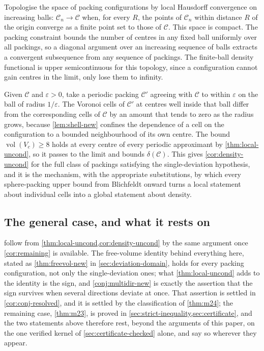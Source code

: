 \documentclass[11pt,reqno]{amsart}
\renewcommand{\_}{\origunderscore\allowbreak}
\numberwithin{equation}{section}
\theoremstyle{plain}
\theoremstyle{definition}
\theoremstyle{remark}
\DeclareMathOperator{\vol}{vol}
\begin{document}
Topologise the space of packing configurations by local Hausdorff
convergence on increasing balls: $\mathcal{C}_n\to\mathcal{C}$ when, for
every $R$, the points of $\mathcal{C}_n$ within distance $R$ of the
origin converge as a finite point set to those of $\mathcal{C}$. This
space is compact. The packing constraint bounds the number of centres in
any fixed ball uniformly over all packings, so a diagonal argument over
an increasing sequence of balls extracts a convergent subsequence from
any sequence of packings. The finite-ball density functional is upper
semicontinuous for this topology, since a configuration cannot gain
centres in the limit, only lose them to infinity.

Given $\mathcal{C}$ and $\varepsilon>0$, take a periodic packing
$\mathcal{C}'$ agreeing with $\mathcal{C}$ to within $\varepsilon$ on
the ball of radius $1/\varepsilon$. The Voronoi cells of $\mathcal{C}'$
at centres well inside that ball differ from the corresponding cells of
$\mathcal{C}$ by an amount that tends to zero as the radius grows,
because \cref{lem:shell-new} confines the dependence of a cell on the
configuration to a bounded neighbourhood of its own centre. The bound
$\vol(V_c)\ge8$ holds at every centre of every periodic approximant by
\cref{thm:local-uncond}, so it passes to the limit and bounds
$\delta(\mathcal{C})$. This gives \cref{cor:density-uncond} for the full
class of packings satisfying the single-deviation hypothesis, and it is
the mechanism, with the appropriate substitutions, by which every
sphere-packing upper bound from Blichfeldt \cite{Bli29} onward turns a
local statement about individual cells into a global statement about
density.

\subsection{The general case, and what it rests on}

 follow from
\cref{thm:local-uncond,cor:density-uncond} by the same argument once
\cref{cor:remaining} is available. The free-volume identity behind
everything here, stated as \cref{thm:freevol-new} in
\cref{sec:deviation-domain}, holds for every packing configuration, not
only the single-deviation ones; what \cref{thm:local-uncond} adds to the
identity is the sign, and \cref{conj:multidir-new} is exactly the
assertion that the sign survives when several directions deviate at
once. That assertion is settled in \cref{cor:conj-resolved}, and it is
settled by the classification of \cref{thm:m24}; the remaining case,
\cref{thm:m23}, is proved in \cref{sec:strict-inequality,sec:certificate},
and the two statements above therefore rest, beyond the arguments of
this paper, on the one verified kernel of \cref{sec:certificate-checked}
alone, and say so wherever they appear.
\end{document}
